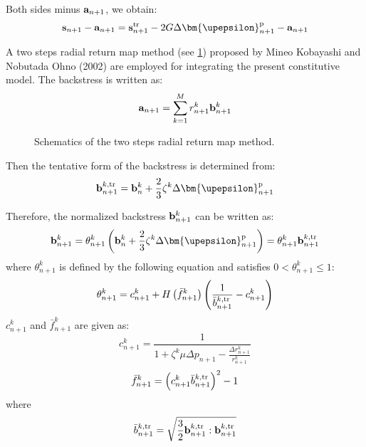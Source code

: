 Both sides minus ${{\bf{a}}_{n + 1}}$, we obtain:
\begin{equation}
\label{Equ:sminusa1}
{{\bf{s}}_{n + 1}} - {{\bf{a}}_{n + 1}} = {\bf{s}}_{n + 1}^{\rm{tr}} - 2G\Delta {\bm{\upepsilon }}_{n + 1}^{\rm{p}} - {{\bf{a}}_{n + 1}}
\end{equation}

A two steps radial return map method (see \ref{Fig:radial_return_map}) proposed by Mineo Kobayashi and Nobutada Ohno (2002) \cite{kobayashi2002implementation} are employed for integrating the present constitutive model. The backstress is written as:
\begin{equation}
{{\bf{a}}_{n + 1}} = \sum\limits_{k = 1}^M {r_{n + 1}^k{\bf{b}}_{n + 1}^k}
\end{equation}
\begin{figure}[!htp]
\centering{}
\caption{Schematics of the two steps radial return map method.}
\label{Fig:radial_return_map}
\end{figure}

Then the tentative form of the backstress is determined from:
\begin{equation}
\label{Equ:btrn+1}
{\bf{b}}_{n + 1}^{k,{\rm{tr}}} = {\bf{b}}_n^k + \frac{2}{3}{\zeta ^k}\Delta {\bm{\upepsilon }}_{n + 1}^{\rm{p}}
\end{equation}

Therefore, the normalized backstress ${\bf{b}}_{n + 1}^k$ can be written as:
\begin{equation}
\label{Equ:bn+1}
{\bf{b}}_{n + 1}^k = \theta _{n + 1}^k\left( {{\bf{b}}_n^k + \frac{2}{3}{\zeta ^k}\Delta {\bm{\upepsilon }}_{n + 1}^{\rm{p}}} \right) = \theta _{n + 1}^k{\bf{b}}_{n + 1}^{k,{\rm{tr}}}
\end{equation}
where $\theta _{n + 1}^k$ is defined by the following equation and satisfies $0 < \theta _{n + 1}^k \leqslant 1$:
\begin{equation}
\label{Equ:thetan+1}
\theta _{n + 1}^k = c_{n + 1}^k + H\left( {\bar f_{n + 1}^k} \right)\left( {\frac{1}{{\bar b_{n + 1}^{k,{\rm{tr}}}}} - c_{n + 1}^k} \right)
\end{equation}
$c_{n + 1}^k$ and ${\bar f_{n + 1}^k}$ are given as:
\begin{equation}
c_{n + 1}^k = \frac{1}{{1 + {\zeta ^k}\mu \Delta {p_{n + 1}} - \frac{{\Delta r_{n + 1}^k}}{{r_{n + 1}^k}}}}
\end{equation}
\begin{equation}
\bar f_{n + 1}^k = {\left( {c_{n + 1}^k\bar b_{n + 1}^{k,{\rm{tr}}}} \right)^2} - 1
\end{equation}
where
\begin{equation}
\bar b_{n + 1}^{k,{\rm{tr}}} = \sqrt {\frac{3}{2}{\bf{b}}_{n + 1}^{k,{\rm{tr}}}:{\bf{b}}_{n + 1}^{k,{\rm{tr}}}}
\end{equation}

